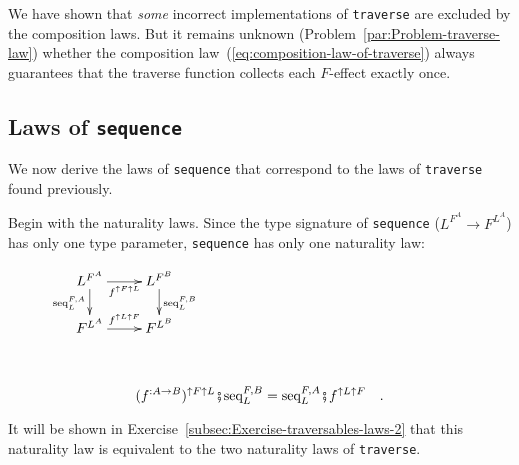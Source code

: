 We have shown that \emph{some} incorrect implementations of \lstinline!traverse!
are excluded by the composition laws. But it remains unknown (Problem~\ref{par:Problem-traverse-law})
whether the composition law~(\ref{eq:composition-law-of-traverse})
always guarantees that the traverse function collects each $F$-effect
exactly once.

\subsection{Laws of \texttt{sequence}}

We now derive the laws of \lstinline!sequence! that correspond to
the laws of \lstinline!traverse! found previously. 

Begin with the naturality laws. Since the type signature of \lstinline!sequence!
($L^{F^{A}}\rightarrow F^{L^{A}}$) has only one type parameter, \lstinline!sequence!
has only one naturality law:%
\begin{comment}
precarious formatting
\end{comment}

\begin{wrapfigure}{i}{0.22\columnwidth}%
\vspace{-1.3\baselineskip}
$\xymatrix{\xyScaleY{1.5pc}\xyScaleX{2.0pc}L^{F^{A}}\ar[d]\sb(0.45){\text{seq}_{L}^{F,A}}\ar[r]\sb(0.5){f^{\uparrow F\uparrow L}} & L^{F^{B}}\ar[d]\sp(0.45){\text{seq}_{L}^{F,B}}\\
F^{L^{A}}\ar[r]\sp(0.5){f^{\uparrow L\uparrow F}} & F^{L^{B}}
}
$\vspace{1.5\baselineskip}
\end{wrapfigure}%

~\vspace{-1.4\baselineskip}

\begin{equation}
(f^{:A\rightarrow B})^{\uparrow F\uparrow L}\bef\text{seq}_{L}^{F,B}=\text{seq}_{L}^{F,A}\bef f^{\uparrow L\uparrow F}\quad.\label{eq:sequence-naturality-law}
\end{equation}

\noindent It will be shown in Exercise~\ref{subsec:Exercise-traversables-laws-2}
that this naturality law is equivalent to the two naturality laws
of \lstinline!traverse!.


